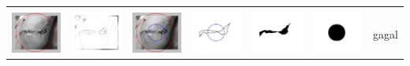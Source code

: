 \begin{table}[H]
\begin{tabular}{|m{0.7in}|m{0.7in}|m{0.7in}|m{0.7in}|m{0.7in}|m{0.7in}|m{0.7in}|}
		&  &  & & & &  \\
		\includegraphics[width=0.7in]{dataset/dataset_3/luka_hitam/ready/16_integer_init.jpg}&
		\includegraphics[width=0.7in]{dataset/dataset_3/luka_hitam/ready/16_integer_ext.jpg}&
		\includegraphics[width=0.7in]{dataset/dataset_3/luka_hitam/ready/16_integer_result.jpg}&
		\includegraphics[width=0.7in]{dataset/dataset_3/luka_hitam/ready/16_gt_r_integer.jpg}&
		\includegraphics[width=0.7in]{dataset/dataset_3/luka_hitam/ready/16_r.jpg}&
		\includegraphics[width=0.7in]{dataset/dataset_3/luka_hitam/ready/16_integer_r.jpg}&
		gagal\\
		\hline
		

\end{tabular}
\end{table}
